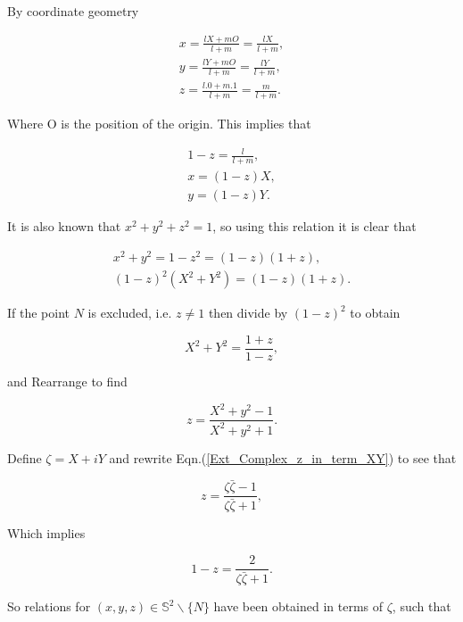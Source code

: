 \noindent By coordinate geometry

\begin{eqnarray*}  
x = \frac{lX + mO}{l+m} = \frac{lX}{l+m}, \\
y = \frac{lY + mO}{l+m} = \frac{lY}{l+m}, \\
z = \frac{l.0+ m.1}{l+m} = \frac{m}{l+m}.
\end{eqnarray*}

\noindent Where O is the position of the origin. This implies that

\begin{eqnarray*}
1-z = \frac{l}{l+m}, \\
x = (1-z)X, \\
y = (1-z)Y.
\end{eqnarray*}

\noindent It is also known that $x^2+ y^2 +z^2 = 1$, so using this relation it is clear that

\begin{eqnarray*}
x^2 + y^2 = 1-z^2 = (1-z) (1+z), \\
(1-z)^2(X^2 +Y^2) = (1-z) (1+z).
\end{eqnarray*}

\noindent If the point $N$ is excluded, i.e. $z \neq 1$ then divide by $(1-z)^2$ to obtain

\begin{equation*} 
X^2 + Y^2 = \frac{1+z}{1-z},
\end{equation*}

\noindent and Rearrange to find

\begin{equation}\label{Ext_Complex_z_in_term_XY} 
z = \frac{X^2 + y^2 - 1}{X^2 + y^2 + 1}.
\end{equation}

Define $\zeta = X+ iY$ and rewrite Eqn.(\ref{Ext_Complex_z_in_term_XY}) to see that

\begin{equation*}
z = \frac{\zeta\bar{\zeta} - 1}{\zeta\bar{\zeta} + 1},
\end{equation*}

\noindent Which implies

\begin{equation*}
1- z = \frac{2}{\zeta\bar{\zeta} + 1}.
\end{equation*}

\noindent So relations for $(x,y,z) \in \mathbb{S}^2 \backslash \{N\}$ have been obtained in terms of $\zeta$, such that

